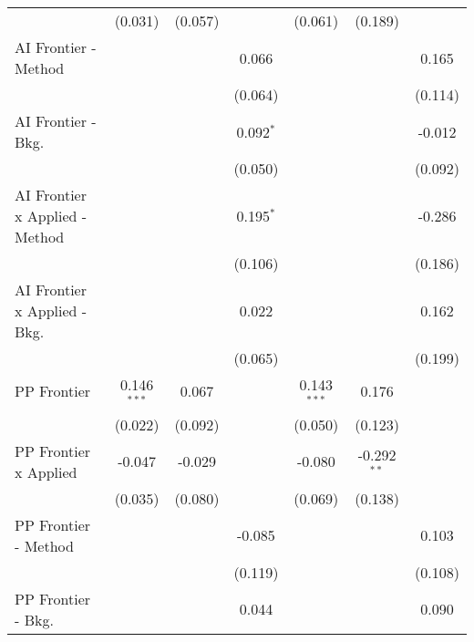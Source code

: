 \begin{tabular}{lcccccc}
                                  & (0.031)       & (0.057)        &                & (0.061)       & (0.189)       &   \\   
   AI Frontier - Method           &               &                & 0.066          &               &               & 0.165\\   
                                  &               &                & (0.064)        &               &               & (0.114)\\   
   AI Frontier - Bkg.             &               &                & 0.092$^{*}$    &               &               & -0.012\\   
                                  &               &                & (0.050)        &               &               & (0.092)\\   
   AI Frontier x Applied - Method &               &                & 0.195$^{*}$    &               &               & -0.286\\   
                                  &               &                & (0.106)        &               &               & (0.186)\\   
   AI Frontier x Applied - Bkg.   &               &                & 0.022          &               &               & 0.162\\   
                                  &               &                & (0.065)        &               &               & (0.199)\\   
   PP Frontier                    & 0.146$^{***}$ & 0.067          &                & 0.143$^{***}$ & 0.176         &   \\   
                                  & (0.022)       & (0.092)        &                & (0.050)       & (0.123)       &   \\   
   PP Frontier x Applied          & -0.047        & -0.029         &                & -0.080        & -0.292$^{**}$ &   \\   
                                  & (0.035)       & (0.080)        &                & (0.069)       & (0.138)       &   \\   
   PP Frontier - Method           &               &                & -0.085         &               &               & 0.103\\   
                                  &               &                & (0.119)        &               &               & (0.108)\\   
   PP Frontier - Bkg.             &               &                & 0.044          &               &               & 0.090\\   

\end{tabular}
